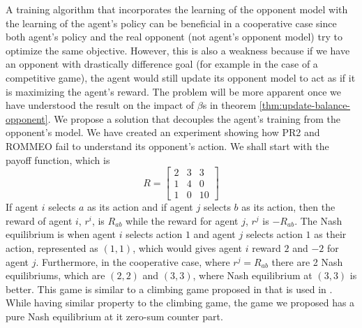 A training algorithm that incorporates the learning of the opponent model with the learning of the agent's policy can be beneficial in a cooperative case since both agent's policy and the real opponent (not agent's opponent model) try to optimize the same objective. However, this is also a weakness because if we have an opponent with drastically difference goal (for example in the case of a competitive game), the agent would still update its opponent model to act as if it is maximizing the agent's reward. The problem will be more apparent once we have understood the result on the impact of $\beta$s in theorem \ref{thm:update-balance-opponent}. We propose a solution that decouples the agent's training from the opponent's model. We have created an experiment showing how PR2 and ROMMEO fail to understand its opponent's action. We shall start with the payoff function, which is 
\begin{equation}
\label{eqn:chap3-matrix-game}
    R = \begin{bmatrix}
    2 & 3 & 3 \\
    1 & 4 & 0 \\
    1 & 0 & 10
    \end{bmatrix}
\end{equation}
If agent $i$ selects $a$ as its action and if agent $j$ selects $b$ as its action, then the reward of agent $i$, $r^i$, is $R_{ab}$ while the reward for agent $j$, $r^{j}$ is $-R_{ab}$. The Nash equilibrium is when agent $i$ selects action $1$ and agent $j$ selects action $1$ as their action, represented as $(1, 1)$, which would gives agent $i$ reward $2$ and $-2$ for agent $j$. Furthermore, in the cooperative case, where $r^{j} = R_{ab}$ there are 2 Nash equilibriums, which are $(2, 2)$ and $(3, 3)$, where Nash equilibrium at $(3, 3)$ is better. This game is similar to a climbing game proposed in \cite{claus1998dynamics} that is used in \cite{tian2019regularized}. While having similar property to the climbing game, the game we proposed has a pure Nash equilibrium at it zero-sum counter part. 


